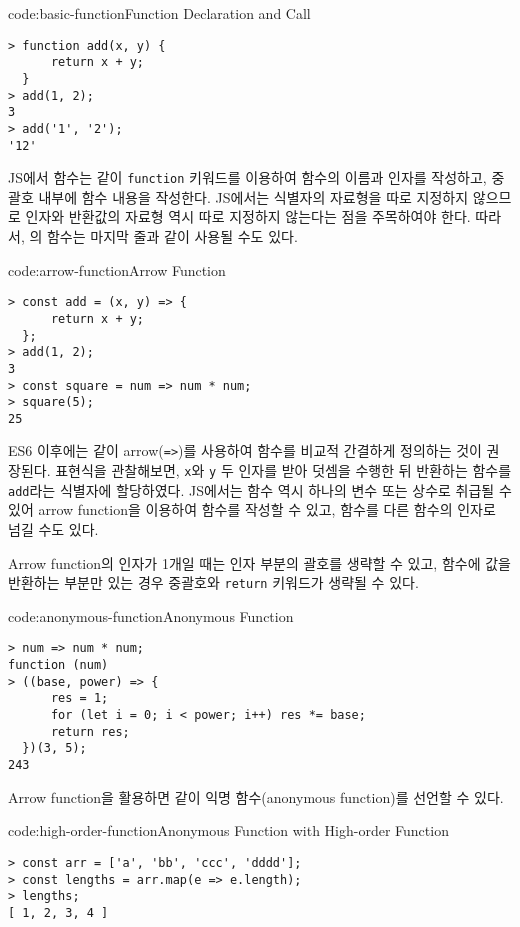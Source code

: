 \begin{codeenv}{code:basic-function}{Function Declaration and Call}\begin{verbatim}
> function add(x, y) {
      return x + y;
  }
> add(1, 2);
3
> add('1', '2');
'12'
\end{verbatim}
\end{codeenv}

JS에서 함수는 \과 같이 \texttt{function} 키워드를 이용하여 함수의 이름과 인자를 작성하고, 중괄호 내부에 함수 내용을 작성한다. JS에서는 식별자의 자료형을 따로 지정하지 않으므로 인자와 반환값의 자료형 역시 따로 지정하지 않는다는 점을 주목하여야 한다. 따라서, 의 함수는 마지막 줄과 같이 사용될 수도 있다.

\begin{codeenv}{code:arrow-function}{Arrow Function}\begin{verbatim}
> const add = (x, y) => {
      return x + y;
  };
> add(1, 2);
3
> const square = num => num * num;
> square(5);
25
\end{verbatim}
\end{codeenv}

ES6 이후에는 \과 같이 arrow(\texttt{=>})를 사용하여 함수를 비교적 간결하게 정의하는 것이 권장된다. 표현식을 관찰해보면, \texttt{x}와 \texttt{y} 두 인자를 받아 덧셈을 수행한 뒤 반환하는 함수를 \texttt{add}라는 식별자에 할당하였다. JS에서는 함수 역시 하나의 변수 또는 상수로 취급될 수 있어 arrow function을 이용하여 함수를 작성할 수 있고, 함수를 다른 함수의 인자로 넘길 수도 있다.

Arrow function의 인자가 1개일 때는 인자 부분의 괄호를 생략할 수 있고, 함수에 값을 반환하는 부분만 있는 경우 중괄호와 \texttt{return} 키워드가 생략될 수 있다.

\begin{codeenv}{code:anonymous-function}{Anonymous Function}\begin{verbatim}
> num => num * num;
function (num)
> ((base, power) => {
      res = 1;
      for (let i = 0; i < power; i++) res *= base;
      return res;
  })(3, 5);
243
\end{verbatim}
\end{codeenv}

Arrow function을 활용하면 \과 같이 익명 함수(anonymous function)를 선언할 수 있다.

\begin{codeenv}{code:high-order-function}{Anonymous Function with High-order Function}\begin{verbatim}
> const arr = ['a', 'bb', 'ccc', 'dddd'];
> const lengths = arr.map(e => e.length);
> lengths;
[ 1, 2, 3, 4 ]
\end{verbatim}
\end{codeenv}

